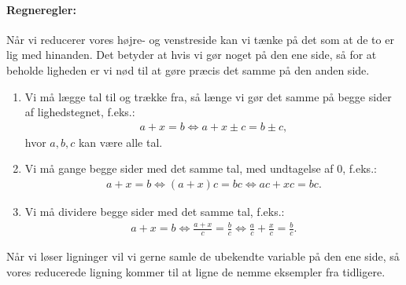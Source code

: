 \paragraph*{Regneregler:}
Når vi reducerer vores højre- og venstreside kan vi tænke på det som at de to er lig med hinanden. Det betyder at hvis vi gør noget på den ene side, så for at beholde ligheden er vi nød til at gøre præcis det samme på den anden side.
\begin{enumerate}
\item Vi må lægge tal til og trække fra, så længe vi gør det samme på begge sider af lighedstegnet, f.eks.:
\begin{align*}
a + x = b \Leftrightarrow a+x \pm c = b \pm c, 
\end{align*}
hvor $a,b,c$ kan være alle tal.
\item Vi må gange begge sider med det samme tal, med undtagelse af $0$, f.eks.:
\begin{align*}
a + x = b \Leftrightarrow (a + x)c = bc \Leftrightarrow ac + xc = bc. 
\end{align*}
\item Vi må dividere begge sider med det samme tal, f.eks.:
\begin{align*}
a + x = b \Leftrightarrow \frac{a+x}{c} = \frac{b}{c} \Leftrightarrow \frac{a}{c}  + \frac{x}{c} = \frac{b}{c}.
\end{align*}
\end{enumerate}
Når vi løser ligninger vil vi gerne samle de ubekendte variable på den ene side, så vores reducerede ligning kommer til at ligne de nemme eksempler fra tidligere.

